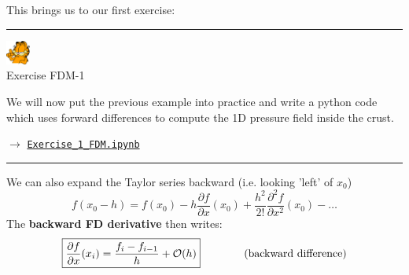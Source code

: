 This brings us to our first exercise:

\begin{center}
\begin{minipage}[t]{0.77\textwidth}
\par\noindent\rule{\textwidth}{0.4pt}

\begin{center}
\includegraphics[width=0.8cm]{images/garftr} \\
{\color{orange}Exercise FDM-1}
\end{center}

We will now put the previous example into practice and write a 
python code which uses forward differences to compute the 1D pressure
field inside the crust.

$\rightarrow$ 
\href{http://cedricthieulot.net/images/compgeo/Exercise_1_FDM.ipynb}
{\tt Exercise\_1\_FDM.ipynb}

\par\noindent\rule{\textwidth}{0.4pt}
\end{minipage}
\end{center}







\noindent We can also expand the Taylor series backward (i.e. looking 'left' of $x_0$)
\begin{equation}
f(x_0-h)=f(x_0)-
h \frac{\partial f}{\partial x}(x_0)  + 
\frac{h^2}{2!} \frac{\partial^2 f}{\partial x^2}(x_0)  -
\dots 
\end{equation}
The {\bf backward FD derivative} then writes:
\begin{equation}
\boxed{
\frac{\partial f}{\partial x}(x_i) = \frac{f_{i}-f_{i-1}}{h} + {\cal O}(h) 
}
\qquad
\qquad
\text{(backward difference)} 
\end{equation}




